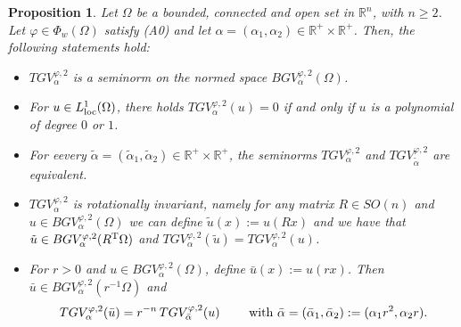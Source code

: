 \documentclass[a4paper,11pt,oneside,notitlepage]{article}
\newtheorem{proposition}[theorem]{Proposition}
\numberwithin{equation}{section}
\def\R{\mathbb{R}}
\def\loc{{\rm loc}}
\newcommand{\T}{\textnormal{T}}
\newcommand{\vphi}{\varphi}
\begin{document}
\begin{proposition}
\label{prop:TGV_prop}
    Let $\Omega$ be a bounded, connected and open set in $\R^n$, with $n \ge 2$. Let $\vphi \in \Phi_w(\Omega)$ satisfy (A0) and let $\alpha = (\alpha_1, \alpha_2) \in \R^+ \times \R^+$. Then, the following statements hold:
    \begin{itemize}
        \item[(i)] $TGV^{\vphi,2}_\alpha$ is a seminorm on the normed space $BGV^{\vphi,2}_\alpha(\Omega)$.
        
        \item[(ii)] For $u \in L^1_\loc(\Omega)$, there holds $TGV^{\vphi,2}_\alpha(u) = 0$ if and only if $u$ is a polynomial of degree $0$ or $1$.
        
        \item[(iii)] For eevery $\tilde\alpha = (\tilde\alpha_1, \tilde\alpha_2) \in \R^+ \times \R^+$, the seminorms $TGV^{\vphi,2}_\alpha$ and $TGV^{\vphi,2}_{\tilde\alpha}$ are equivalent.
        
        \item[(iv)] $TGV^{\vphi,2}_\alpha$ is rotationally invariant, namely for any matrix $R \in SO(n)$ and $u \in BGV^{\vphi,2}_\alpha(\Omega)$ we can define $\tilde{u}(x) := u(Rx)$ and we have that $\tilde{u} \in BGV^{\vphi,2}_\alpha(R^\T\Omega)$ and $TGV^{\vphi,2}_\alpha(\tilde{u}) = TGV^{\vphi,2}_\alpha(u)$.
        
        \item[(v)] For $r > 0$ and $u \in BGV^{\vphi,2}_\alpha(\Omega)$, define $\bar{u}(x) := u(rx)$. Then $\bar{u} \in BGV^{\vphi,2}_\alpha(r^{-1}\Omega)$ and
        \begin{equation*}
            TGV^{\vphi,2}_\alpha(\bar{u}) = r^{-n} \, TGV^{\vphi,2}_{\bar\alpha}(u) \qquad \textnormal{ with } \bar\alpha = (\bar\alpha_1, \bar\alpha_2) := (\alpha_1 r^2, \alpha_2 r).
        \end{equation*}
    \end{itemize}
\end{proposition}
\end{document}

